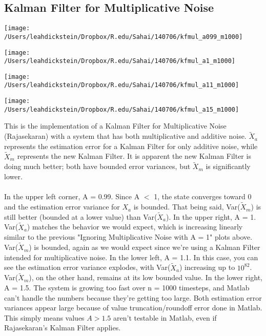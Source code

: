 \documentclass[leqno,twocolumn]{article}
\begin{document}
\subsection{Kalman Filter for Multiplicative Noise}
\begin{minipage}[c]{0.5\textwidth}
\texttt{[image: /Users/leahdickstein/Dropbox/R.edu/Sahai/140706/kfmul\_a099\_m1000]}
\end{minipage}
\begin{minipage}[c]{0.5\textwidth}
\texttt{[image: /Users/leahdickstein/Dropbox/R.edu/Sahai/140706/kfmul\_a1\_m1000]}
\end{minipage}

\begin{minipage}[c]{0.5\textwidth}
\texttt{[image: /Users/leahdickstein/Dropbox/R.edu/Sahai/140706/kfmul\_a11\_m1000]}
\end{minipage}
\begin{minipage}[c]{0.5\textwidth}
\texttt{[image: /Users/leahdickstein/Dropbox/R.edu/Sahai/140706/kfmul\_a15\_m1000]}
\end{minipage}

This is the implementation of a Kalman Filter for Multiplicative Noise (Rajasekaran) with a system that has both multiplicative and additive noise. $\tilde{X}_a$ represents the estimation error for a Kalman Filter for only additive noise, while $\tilde{X}_m$ represents the new Kalman Filter. It is apparent the new Kalman Filter is doing much better; both have bounded error variances, but $\tilde{X}_m$ is significantly lower.\\\\
In the upper left corner, A = 0.99. Since A $<$ 1, the state converges toward 0 and the estimation error variance for $X_a$ is bounded. That being said, Var($\tilde{X}_m$) is still better (bounded at a lower value) than Var($\tilde{X}_a$). In the upper right, A = 1. Var($\tilde{X}_a$) matches the behavior we would expect, which is increasing linearly similar to the previous "Ignoring Multiplicative Noise with A = 1" plots above. Var($\tilde{X}_m$) is bounded, again as we would expect since we're using a Kalman Filter intended for multiplicative noise. In the lower left, A = 1.1. In this case, you can see the estimation error variance explodes, with Var($\tilde{X}_a$) increasing up to $10^82$. Var($\tilde{X}_m$), on the other hand, remains at its low bounded value. In the lower right, A = 1.5. The system is growing too fast over n = 1000 timesteps, and Matlab can't handle the numbers because they're getting too large. Both estimation error variances appear large because of value truncation/roundoff error done in Matlab. This simply means values $A > 1.5$ aren't testable in Matlab, even if Rajasekaran's Kalman Filter applies.
\end{document}
